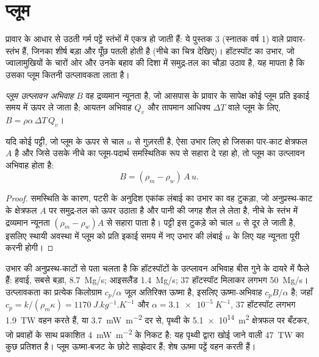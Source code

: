 \section{प्लूम}

प्रावार के आधार से उठती गर्म पट्टें स्तंभों में एकत्र हो जाती हैं: ये
पुस्तक 3 (स्नातक वर्ष 1) वाले प्रावार-स्तंभ हैं, जिनका शीर्ष बड़ा और पूँछ पतली होती है (नीचे का चित्र देखिए)।
हॉटस्पॉट का उभार, जो ज्वालामुखियों के चारों ओर और उनके बहाव की दिशा में समुद्र-तल का चौड़ा उठाव है,
यह मापता है कि उसका प्लूम कितनी उत्प्लावकता लाता है।

\begin{definition}[प्लूम उत्प्लावन अभिवाह]\label{def:b3:mantle-convection:buoyancy-flux}
\emph{प्लूम उत्प्लावन अभिवाह} $B$ वह द्रव्यमान न्यूनता है,
जो आसपास के प्रावार के सापेक्ष कोई प्लूम प्रति इकाई
समय में ऊपर ले जाता है; आयतन अभिवाह $Q_v$ और तापमान आधिक्य $\Delta T$ वाले प्लूम के लिए,
$B = \rho\alpha\,\Delta T\,Q_v$।
\end{definition}

\begin{proposition}[उभार से उत्प्लावन अभिवाह]\label{prop:b3:mantle-convection:swell}
यदि कोई पट्टी, जो प्लूम के ऊपर से चाल $u$ से गुज़रती है, ऐसा उभार लिए हो
जिसका पार-काट क्षेत्रफल $A$ है और जिसे उसके नीचे का प्लूम-पदार्थ समस्थितिक रूप से सहारा दे रहा हो,
तो प्लूम का उत्प्लावन अभिवाह होता है:
\[
  B = (\rho_m - \rho_w)\,A\,u .
\]
\end{proposition}

\begin{proof}
समस्थिति के कारण, पटरी के अनुदिश एकांक लंबाई का उभार का वह टुकड़ा, जो
अनुप्रस्थ-काट के क्षेत्रफल $A$ पर समुद्र-तल को ऊपर उठाता है और पानी की जगह शैल ले लेता है,
नीचे के स्तंभ में द्रव्यमान न्यूनता $(\rho_m - \rho_w)A$ से सहारा पाता है।
पट्टी इस टुकड़े को चाल $u$ से दूर ले जाती है, इसलिए स्थायी अवस्था में प्लूम को
प्रति इकाई समय में नए उभार की लंबाई $u$ के लिए यह न्यूनता पूरी करनी होगी।
\end{proof}

उभार की अनुप्रस्थ-काटों से पता चलता है कि हॉटस्पॉटों के उत्प्लावन अभिवाह बीस गुने के दायरे में फैले हैं:
हवाई, सबसे बड़ा, \qty{8.7}{Mg/s}; आइसलैंड
\qty{1.4}{Mg/s}; 37 हॉटस्पॉट मिलाकर लगभग \qty{50}{Mg/s}। उत्प्लावकता का प्रत्येक किलोग्राम
$c_p/\alpha$ जूल अतिरिक्त ऊष्मा है, इसलिए ऊष्मा-अभिवाह $c_pB/\alpha$ है;
जहाँ $c_p = k/(\rho_m\kappa) = \qty{1170}{J.kg^{-1}.K^{-1}}$ और $\alpha =
\qty{3.1e-5}{K^{-1}}$, 37 हॉटस्पॉट लगभग \qty{1.9}{TW} वहन करते हैं, या
\qty{3.7}{mW.m^{-2}} दर से, पृथ्वी के \qty{5.1e14}{m^2} क्षेत्रफल पर बँटकर, जो
प्रवाहों के साथ प्रकाशित \qty{4}{mW.m^{-2}} के निकट है: यह पृथ्वी द्वारा
खोई जाने वाली \qty{47}{TW} का कुछ प्रतिशत है। प्लूम ऊष्मा-बजट के छोटे साझेदार हैं;
शेष ऊष्मा पट्टें वहन करती हैं।

